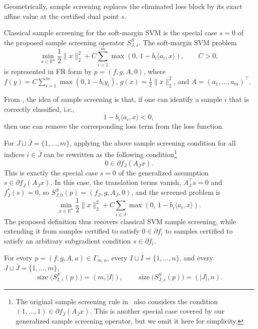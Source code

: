 Geometrically, sample screening replaces the eliminated loss block by
its exact affine value at the certified dual point \(s\).

\begin{example}
\label{ex:svm-sample}
Classical sample screening for the soft-margin SVM is the special case
\(s=0\) of the proposed sample screening operator \(S^S_{J,s}\). The
soft-margin SVM problem
\[
\min_{x\in\mathbb R^n}
\frac12\|x\|_2^2
+
C\sum_{i=1}^m
\max\!\left(0,\,1-b_i\langle a_i,x\rangle\right),
\qquad C>0,
\]
is represented in FR form by \(p=(f,g,A,0)\), where
\(f(y)=C\sum_{i=1}^m\max(0,1-b_i y_i)\), \(g(x)=\frac12\|x\|_2^2\), and
\(A=(a_1,\ldots,a_m)^\top\).

From \citep{ogawa2013}, the idea of sample screening is that, if one can identify a sample \(i\) that is correctly classified, i.e.,
\[1-b_i\langle a_i,x\rangle<0,\]
then one can remove the corresponding loss term from the loss function.

For \(J\sqcup\bar J=\{1,\ldots,m\}\), applying the above sample
screening condition for all indices \(i\in\bar J\) can be rewritten as the following condition\footnote{The original sample screening rule in~\citep{ogawa2013} also considers the condition
\(
(1,\ldots,1)\in\partial f_{\bar J}(A_{\bar J}x).
\)
This is another special case covered by our generalized sample screening operator, but we omit it here for simplicity.}
\[
0\in\partial f_{\bar J}(A_{\bar J}x).
\]
This is exactly the special case \(s=0\) of the generalized assumption
\(s\in\partial f_{\bar J}(A_{\bar J}x)\). In this case, the translation
terms vanish, \(A_{\bar J}^{\top}s=0\) and \(f_{\bar J}^*(s)=0\), so
\(S^S_{J,0}(p)=(f_J,g,A_J,0)\), and the screened problem is
\[
\min_{x\in\mathbb R^n}
\frac12\|x\|_2^2
+
C\sum_{i\in J}
\max\!\left(0,\,1-b_i\langle a_i,x\rangle\right).
\]
The proposed definition thus recovers classical SVM sample screening,
while extending it from samples certified to satisfy \(0\in\partial
f_i\) to samples certified to satisfy an arbitrary subgradient
condition \(s\in\partial f_i\).
\end{example}

\begin{corollary}
\label{cor:complexity}
For every \(p=(f,g,A,a)\in\Gamma_{m,n}\), every
\(I\sqcup\bar I=\{1,\ldots,n\}\), and every \(J\sqcup\bar J=\{1,\ldots,m\}\),
\[
\operatorname{size}\bigl(S^F_{I,z}(p)\bigr)=(m,|I|),
\qquad
\operatorname{size}\bigl(S^S_{J,s}(p)\bigr)=(|J|,n).
\]
\end{corollary}

